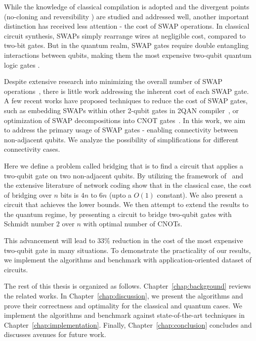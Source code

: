 \documentclass{report}
\begin{document}
While the knowledge of classical compilation is adopted and the divergent points (no-cloning \cite{TODO} and reversibility \cite{shende2003}) are studied and addressed well, another important distinction has received less attention - the cost of SWAP operations. In classical circuit synthesis, SWAPs simply rearrange wires at negligible cost, compared to two-bit gates. But in the quantum realm, SWAP gates require double entangling \cite{TODO} interactions between qubits, making them the most expensive two-qubit quantum logic gates \cite{TODO}.

Despite extensive research into minimizing the overall number of SWAP operations~\cite{childs, TODO}, there is little work addressing the inherent cost of each SWAP gate. A few recent works have proposed techniques to reduce the cost of SWAP gates, such as embedding SWAPs within other 2-qubit gates in 2QAN compiler~\cite{lao2021}, or optimization of SWAP decompositions into CNOT gates~\cite{kissinger2019,nash2020}. In this work, we aim to address the primary usage of SWAP gates - enabling connectivity between non-adjacent qubits. We analyze the possibility of simplifications for different connectivity cases.

Here we define a problem called bridging that is to find a circuit that applies a two-qubit gate on two non-adjacent qubits. By utilizing the framework of~\cite{kissinger2019} and the extensive literature of network coding \cite{TODO} show that in the classical case, the cost of bridging over $n$ bits is $4n$ to $6n$ (upto a $O(1)$ constant). We also present a circuit that achieves the lower bounds. We then attempt to extend the results to the quantum regime, by presenting a circuit to bridge two-qubit gates with Schmidt number $2$ over $n$ with optimal number of CNOTs.

This advancement will lead to $33\%$ reduction in the cost of the most expensive two-qubit gate in many situations. To demonstrate the practicality of our results, we implement the algorithms and benchmark with application-oriented dataset of circuits.

The rest of this thesis is organized as follows. Chapter~\ref{chap:background} reviews the related works. In Chapter~\ref{chap:discussion}, we present the algorithms and prove their correctness and optimality for the classical and quantum cases. We implement the algorithms and benchmark against state-of-the-art techniques in Chapter~\ref{chap:implementation}. Finally, Chapter~\ref{chap:conclusion} concludes and discusses avenues for future work.
\end{document}
